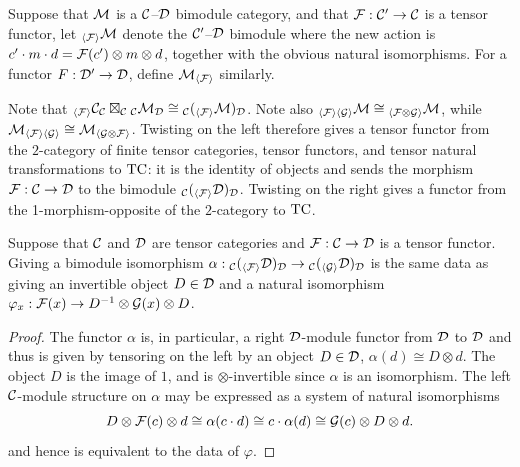 \documentclass{amsart}
\begin{document}
\begin{definition}
Suppose that $\mathcal M$ is a $\mathcal C$--$\mathcal D$ bimodule category, and that $\mathcal F: \mathcal C' \rightarrow \mathcal C$ is a tensor functor, let
${}_{\langle \mathcal F \rangle} \mathcal M$ denote the $\mathcal C'$--$\mathcal D$ bimodule where the new action is $c' \cdot m \cdot d = \mathcal F(c') \otimes m \otimes d$, together with the obvious natural isomorphisms.  For a functor $F: \mathcal D' \rightarrow \mathcal D$, define $\mathcal M_{\langle \mathcal F \rangle}$ similarly.
\end{definition}

Note that ${}_{\langle \mathcal F \rangle} \mathcal C_\mathcal C \boxtimes_{\mathcal C} {}_{\mathcal C} \mathcal M_\mathcal D \cong {}_{\mathcal C} ({}_{\langle \mathcal F \rangle} \mathcal M)_\mathcal D$.  Note also ${}_{\langle \mathcal F \rangle \langle \mathcal G \rangle} \mathcal M \cong {}_{\langle \mathcal F \otimes \mathcal G \rangle} \mathcal M$, while $\mathcal M_{\langle \mathcal F \rangle \langle \mathcal G \rangle} \cong  \mathcal M_{\langle \mathcal G \otimes \mathcal F \rangle}$.  Twisting on the left therefore gives a tensor functor from the $2$-category of finite tensor categories, tensor functors, and tensor natural transformations to $\mathrm{TC}$: it is the identity of objects and sends the morphism $\mathcal F: \mathcal C \rightarrow \mathcal D$ to the bimodule ${}_{\mathcal C} ({}_{\langle \mathcal F \rangle} \mathcal D)_{\mathcal D}$.  Twisting on the right gives a functor from the 1-morphism-opposite of the $2$-category to $\mathrm{TC}$.

\begin{lemma} \label{lem:BimoduleToFunctor}
Suppose that $\mathcal C$ and $\mathcal D$ are tensor categories and $\mathcal F: \mathcal C \rightarrow \mathcal D$ is a tensor functor.
Giving a bimodule isomorphism $\alpha:{}_{\mathcal C} ({}_{\langle \mathcal F \rangle} \mathcal D)_\mathcal D \rightarrow {}_{\mathcal C} ({}_{\langle \mathcal G \rangle} \mathcal D)_\mathcal D$ is the same data as giving an invertible object $D \in \mathcal D$ and a natural isomorphism $\varphi_x: \mathcal F(x) \rightarrow D^{-1} \otimes \mathcal G(x) \otimes D$.
\end{lemma}
\begin{proof}
The functor $\alpha$ is, in particular, a right $\mathcal D$-module functor from $\mathcal D$ to $\mathcal D$ and thus is given by tensoring on the left by an object $D \in \mathcal D$, $\alpha(d) \cong D \otimes d$. The object $D$ is the image of $1$, and is $\otimes$-invertible since $\alpha$ is an isomorphism. The left $\mathcal C$-module structure on $\alpha$ may be expressed as a system of natural isomorphisms
\begin{equation*}
	D \otimes \mathcal F(c) \otimes d \cong \alpha (c \cdot d) \cong c \cdot \alpha(d) \cong \mathcal G(c) \otimes D \otimes d.
\end{equation*}
and hence is equivalent to the data of $\varphi$. 
\end{proof}
\end{document}

